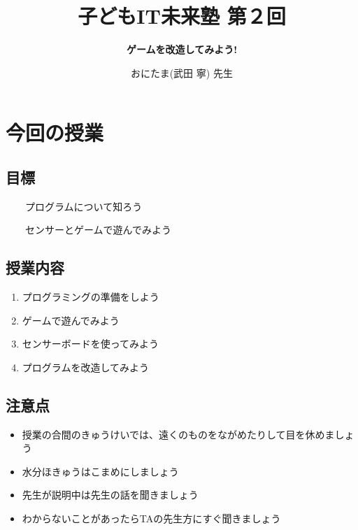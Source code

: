 \documentclass[a4paper,12pt]{jarticle}
\title{\Huge\bf 子どもIT未来塾 第２回}
\author{
\huge\bf ゲームを改造してみよう!
\vspace{15mm}
}
\date{ \Huge おにたま(武田 寧) 先生 }
\begin{document}
\clearpage\setcounter{page}{1}\pagestyle{Standard}
\thispagestyle{FirstPage}

\maketitle

\setcounter{page}{1}\pagestyle{Standard}


\clearpage

\section{今回の授業}
\subsection{目標}
\ \ \ \ プログラムについて知ろう

\ \ \ \ センサーとゲームで遊んでみよう

\subsection{授業内容}
\begin{enumerate}
\item プログラミングの準備をしよう
\item ゲームで遊んでみよう
\item センサーボードを使ってみよう
\item プログラムを改造してみよう
\end{enumerate}
\subsection{注意点}
\begin{itemize}
\item
授業の合間のきゅうけいでは、遠くのものをながめたりして目を休めましょう
\item 水分ほきゅうはこまめにしましょう
\item
先生が説明中は先生の話を聞きましょう
\item
わからないことがあったらTAの先生方にすぐ聞きましょう
\end{itemize}
\end{document}
